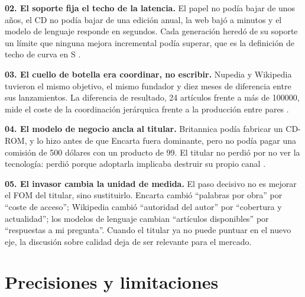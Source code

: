\documentclass[11pt,letterpaper]{article}
\begin{document}
\textbf{02. El soporte fija el techo de la latencia.} El papel no podía bajar de
unos años, el CD no podía bajar de una edición anual, la web bajó a minutos y el
modelo de lenguaje responde en segundos. Cada generación heredó de su soporte un
límite que ninguna mejora incremental podía superar, que es la definición de
techo de curva en S \parencite{foster1986}.

\textbf{03. El cuello de botella era coordinar, no escribir.} Nupedia y
Wikipedia tuvieron el mismo objetivo, el mismo fundador y diez meses de
diferencia entre sus lanzamientos. La diferencia de resultado, 24 artículos frente a más de \num{100000},
mide el coste de la coordinación jerárquica frente a la producción entre pares
\parencite{benkler2002}.

\textbf{04. El modelo de negocio ancla al titular.} Britannica podía fabricar un
CD-ROM, y lo hizo antes de que Encarta fuera dominante, pero no podía pagar una
comisión de 500 dólares con un producto de 99. El titular no perdió por no ver
la tecnología: perdió porque adoptarla implicaba destruir su propio canal
\parencite{christensen1997}.

\textbf{05. El invasor cambia la unidad de medida.} El paso decisivo no es
mejorar el FOM del titular, sino sustituirlo. Encarta cambió \enquote{palabras
por obra} por \enquote{coste de acceso}; Wikipedia cambió \enquote{autoridad del
autor} por \enquote{cobertura y actualidad}; los modelos de lenguaje cambian
\enquote{artículos disponibles} por \enquote{respuestas a mi pregunta}. Cuando
el titular ya no puede puntuar en el nuevo eje, la discusión sobre calidad deja
de ser relevante para el mercado.

\section{Precisiones y limitaciones}
\end{document}
